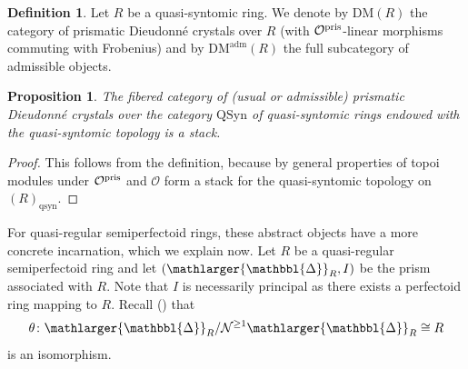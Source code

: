 \documentclass{amsart}
\newcommand{\prism}{{\mathlarger{\mathbbl{\Delta}}}}
\theoremstyle{plain}
\newtheorem{proposition}[theorem]{Proposition}
\theoremstyle{definition}
\newtheorem{definition}[theorem]{Definition}
\newcommand{\Fil}{\mathrm{Fil}}
\newcommand{\red}[1]{{\color{black} #1}}
\newcommand{\olive}[1]{{\color{black}#1}}
\newcommand{\green}[1]{{\color{black}#1}}
\begin{document}

\begin{definition}
  \label{sec:abstr-divid-prism-definition-category-of-divided-dieudonne-crystals}
  Let $R$ be a quasi-syntomic ring. We denote by $\mathrm{DM}(R)$ the category of prismatic Dieudonn\'e crystals over $R$ (with $\mathcal{O}^{\rm pris}$-linear morphisms commuting with Frobenius) and by $\mathrm{DM}^{\mathrm{adm}}(R)$ the full subcategory of admissible objects.
\end{definition}

\begin{proposition}
\label{sec:astr-divid-prism-proposition-descent}
The fibered category of \red{(usual or admissible)} prismatic Dieudonn\'e crystals over the category $\mathrm{QSyn}$ of quasi-syntomic rings endowed with the quasi-syntomic topology is a stack.
\end{proposition}
\begin{proof}
This follows from the definition, because by general properties of topoi modules under $\mathcal{O}^{\rm pris}$ and $\mathcal{O}$ form a stack for the quasi-syntomic topology on $(R)_{\mathrm{qsyn}}$.
\end{proof}


For quasi-regular semiperfectoid rings, these abstract objects have a more concrete incarnation, which we explain now. Let $R$ be a quasi-regular semiperfectoid ring and let $(\prism_R,I)$ be the prism associated with $R$. Note that $I$ is necessarily principal as there exists a perfectoid ring mapping to $R$.
Recall () that
$$
\theta\colon \prism_R/\mathcal{N}^{\geq 1}\prism_R\cong R
$$
is an isomorphism.
\end{document}
